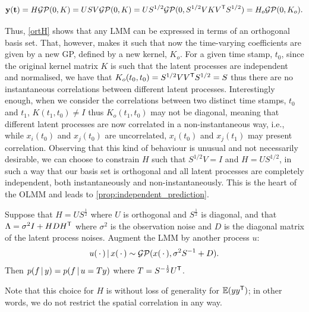 \documentclass{article}
\begin{document}
\begin{equation}
    \mathbf{y(t)} = H \mathcal{GP}(0, K) = U S V \mathcal{GP}(0, K) = U S^{1/2} \mathcal{GP}(0, S^{1/2}V K V^{\text{\textsf{T}}} S^{1/2}) = H_o \mathcal{GP}(0, K_o).
    \label{ortH}
\end{equation}

Thus, \cref{ortH} shows that any LMM can be expressed in terms of an orthogonal basis set. 
That, however, makes it such that now the time-varying coefficients are given by a new GP, defined by a new kernel, $K_o$. 
For a given time stamp, $t_0$, since the original kernel matrix $K$ is such that the latent processes are independent and normalised, we have that $K_o(t_0, t_0) = S^{1/2}V V^{\text{\textsf{T}}} S^{1/2} = S$ thus there are no instantaneous correlations between different latent processes. 
Interestingly enough, when we consider the correlations between two distinct time stamps, $t_0$ and $t_1$, $K(t_1, t_0) \neq I$ thus $K_o(t_1, t_0)$ may not be diagonal, meaning that different latent processes are now correlated in a non-instantaneous way, i.e., while $x_i(t_0)$ and $x_j(t_0)$ are uncorrelated, $x_i(t_0)$ and $x_j(t_1)$ may present correlation. 
Observing that this kind of behaviour is unusual and not necessarily desirable, we can choose to constrain $H$ such that $S^{1/2}V = I$ and $H = US^{1/2}$, in such a way that our basis set is orthogonal and all latent processes are completely independent, both instantaneously and non-instantaneously. 
This is the heart of the OLMM and leads to \cref{prop:independent_prediction}. 

\begin{proposition} \label{prop:independent_prediction}
    Suppose that $H=US^{\frac{1}{2}}$ where $U$ is orthogonal and $S^{\frac{1}{2}}$ is diagonal, and that $\Lambda = \sigma^2 I + H D H^{\text{\textsf{T}}}$ where $\sigma^2$ is the observation noise and $D$ is the diagonal matrix of the latent process noises.
    Augment the LMM by another process $u$:
    \begin{align*}
        u(\,\cdot\,)\, | \, x(\,\cdot\,) \sim \mathcal{GP}(x(\,\cdot\,), \sigma^2 S^{-1} + D).
    \end{align*}
    Then $p(f\, | \, y) = p(f\, | \, u = T y)$ where $T=S^{-\frac{1}{2}} U^{\text{\textsf{T}}}$.
\end{proposition}

Note that this choice for $H$ is without loss of generality for $\mathbb{E}(y y^{\text{\textsf{T}}})$;
in other words, we do not restrict the spatial correlation in any way.
\end{document}
